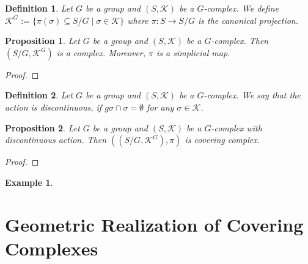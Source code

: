 \documentclass{amsart}
\newtheorem{proposition}{Proposition}[section]
\newtheorem{definition}{Definition}[section]
\newtheorem{example}{Example}[section]
\begin{document}
\begin{definition}
Let $G$ be a group and $(S,\mathcal{K})$ be a $G$-complex. We define $\mathcal{K}^G:=\{\pi(\sigma)\subseteq S/G\mid \sigma\in\mathcal{K}\}$ where $\pi\colon S\longrightarrow S/G$ is the canonical projection.
\end{definition}

\begin{proposition}
Let $G$ be a group and $(S,\mathcal{K})$ be a $G$-complex. Then $(S/G,\mathcal{K}^G)$ is a complex. Moreover, $\pi$ is a simplicial map.
\end{proposition}

\begin{proof}

\end{proof}

\begin{definition}
Let $G$ be a group and $(S,\mathcal{K})$ be a $G$-complex. We say that the action is discontinuous, if $g\sigma\cap\sigma=\emptyset$ for any $\sigma\in\mathcal{K}$.
\end{definition}

\begin{proposition}
Let $G$ be a group and $(S,\mathcal{K})$ be a $G$-complex with discontinuous action. Then $((S/G,\mathcal{K}^G),\pi)$ is covering complex.
\end{proposition}

\begin{proof}

\end{proof}

\begin{example}

\end{example}

\section{Geometric Realization of Covering Complexes}
\end{document}
